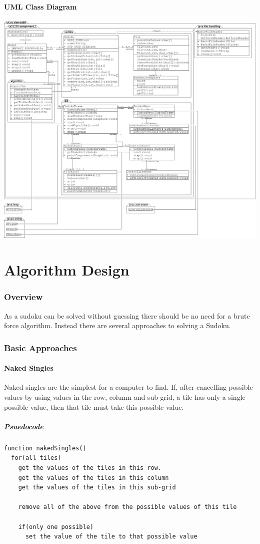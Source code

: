 \documentclass[10pt,letterpaper]{article}
\begin{document}
      \subsection{UML Class Diagram}
	\includegraphics[scale=0.25]{uml.png}
  
  \newpage
  \part{Algorithm Design}
    \section{Overview}
      As a sudoku can be solved without guessing there should be no need for a brute force algorithm. Instead there are several approaches to solving a Sudoku.
    
    \section{Basic Approaches}
      \subsection{Naked Singles}
	Naked singles are the simplest for a computer to find. If, after cancelling possible values by using values in the row, column and sub-grid, a tile has only a single possible value, then that tile must take this possible value.
	
	\subsubsection{Psuedocode}
	  \begin{verbatim}
function nakedSingles()
  for(all tiles)
    get the values of the tiles in this row.
    get the values of the tiles in this column
    get the values of the tiles in this sub-grid
    
    remove all of the above from the possible values of this tile
    
    if(only one possible)
      set the value of the tile to that possible value
	  \end{verbatim}
      
\end{document}
